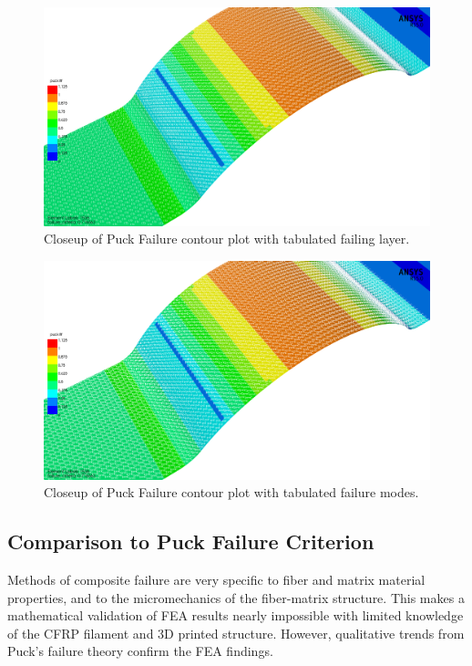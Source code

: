 \begin{figure}[htp]
\centering
\includegraphics[width=1\textwidth]{./figures/fea/fea-acp-pfailure-layer-closeup}
\caption{Closeup of Puck Failure contour plot with tabulated failing layer.}
\label{fig:fea-acp-pfailure-layer-closeup}
\end{figure}

\begin{figure}[htp]
\centering
\includegraphics[width=1\textwidth]{./figures/fea/fea-acp-pfailure-mode-closeup}
\caption{Closeup of Puck Failure contour plot with tabulated failure modes.}
\label{fig:fea-acp-pfailure-mode-closeup}
\end{figure}

\clearpage

\subsection{Comparison to Puck Failure Criterion}

\indent

Methods of composite failure are very specific to fiber and matrix material properties, and to the micromechanics of the fiber-matrix structure. This makes a mathematical validation of FEA results nearly impossible with limited knowledge of the CFRP filament and 3D printed structure. However, qualitative trends from Puck's failure theory confirm the FEA findings.\\

